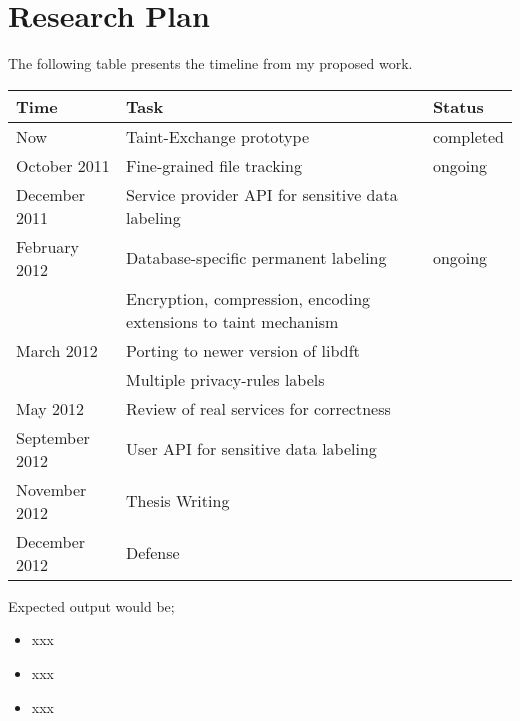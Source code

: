 \section{Research Plan}
\label{sec:plan}

The following table presents the timeline from my proposed work.

\begin{table}[h]
\centering
\begin{tabular}{|l|p{200pt}|l|}
\hline
{\bf Time} & {\bf Task} & {\bf Status} \\
\hline
Now & Taint-Exchange prototype & completed \\
\hline
October 2011 & Fine-grained file tracking  & ongoing \\
\hline
December 2011 & Service provider API for sensitive data labeling & \\
\hline
February 2012 & Database-specific permanent labeling & ongoing\\
 & Encryption, compression, encoding extensions to taint mechanism & \\
 \hline
March 2012 & Porting to newer version of libdft & \\
 & Multiple privacy-rules labels & \\
 \hline
May 2012 & Review of real services for correctness & \\
\hline
September 2012 & User API for sensitive data labeling & \\
\hline
November 2012 & Thesis Writing & \\
\hline
December 2012 & Defense & \\
\hline

\end{tabular}
\end{table}

Expected output would be;

\begin{itemize}
    \item xxx
    \item xxx
    \item xxx
\end{itemize}
